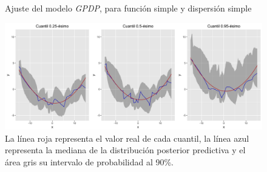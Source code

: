 \begin{figure}[H]
	\centering
	\caption{Ajuste del modelo \textit{GPDP}, para funci\'on simple y dispersi\'on simple}
	\includegraphics[width=\textwidth]{Figures/Simulation/simple_g_simple_error/fitted_models.png}
	\captionsetup{singlelinecheck=off,font=footnotesize}
    \caption*{La l\'inea roja representa el valor real de cada cuantil, la l\'inea azul representa la mediana de la distribuci\'on posterior predictiva y el \'area gris su intervalo de probabilidad al 90\%.}
	\label{fitted_sgse}
\end{figure}

